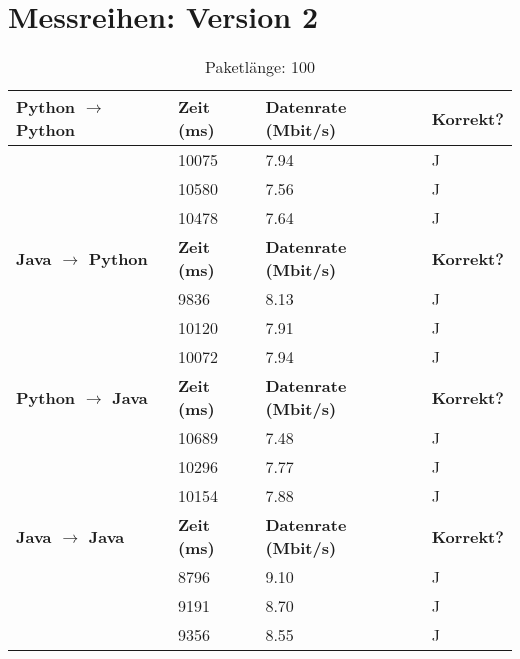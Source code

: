 \documentclass{article}
\begin{document}
    \section{Messreihen: Version 2}
    \begin{table}[]
        \caption{Paketlänge: 100}
        \label{tab:my-table}
        \begin{tabular}{|l|l|l|l|}
            \hline
            \textbf{Python $\rightarrow$ Python} & \textbf{Zeit (ms)} & \textbf{Datenrate (Mbit/s)} & \textbf{Korrekt?} \\ \hline
            & 10075      & 7.94         & J        \\ \cline{2-4}
            & 10580      & 7.56         & J        \\ \cline{2-4}
            & 10478      & 7.64         & J        \\ \hline
            \textbf{Java $\rightarrow$ Python}   & \textbf{Zeit (ms)} & \textbf{Datenrate (Mbit/s)} & \textbf{Korrekt?} \\ \hline
            & 9836       & 8.13         & J        \\ \cline{2-4}
            & 10120      & 7.91         & J        \\ \cline{2-4}
            & 10072      & 7.94         & J        \\ \hline
            \textbf{Python $\rightarrow$ Java}  & \textbf{Zeit (ms)} & \textbf{Datenrate (Mbit/s)} & \textbf{Korrekt?} \\ \hline
            & 10689      & 7.48         & J        \\ \cline{2-4}
            & 10296      & 7.77         & J        \\ \cline{2-4}
            & 10154      & 7.88         & J        \\ \hline
            \textbf{Java $\rightarrow$ Java}   & \textbf{Zeit (ms)} & \textbf{Datenrate (Mbit/s)} & \textbf{Korrekt?} \\ \hline
            & 8796       & 9.10         & J        \\ \cline{2-4}
            & 9191       & 8.70         & J        \\ \cline{2-4}
            & 9356       & 8.55         & J        \\ \hline
        \end{tabular}
    \end{table}
\end{document}
